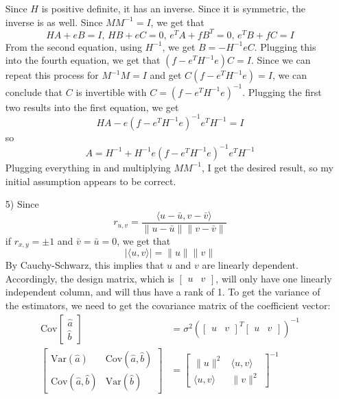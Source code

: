 \documentclass[11pt]{article}
\newcommand{\var}{\mathrm{Var}}
\newcommand{\cov}{\mathrm{Cov}}
\theoremstyle{definition}
\begin{document}
\begin{itemize}
        Since $H$ is positive definite, it has an inverse. Since it is symmetric, the inverse is as well. Since \(MM^{-1}=I\), we get that
        \[HA+eB=I, \, HB+eC=0, \, e^TA+fB^T=0, \, e^TB+fC=I\]
        From the second equation, using $H^{-1}$, we get \(B=-H^{-1}eC\). Plugging this into the fourth equation, we get that \((f-e^TH^{-1}e)C=I\). Since we can repeat this process for \(M^{-1}M=I\) and get \(C(f-e^TH^{-1}e)=I\), we can conclude that $C$ is invertible with \(C=(f-e^TH^{-1}e)^{-1}\). Plugging the first two results into the first equation, we get
        \[HA-e(f-e^TH^{-1}e)^{-1}e^TH^{-1}=I\]
        so
        \[A=H^{-1} + H^{-1}e(f-e^TH^{-1}e)^{-1}e^TH^{-1}\]
        Plugging everything in and multiplying $MM^{-1}$, I get the desired result, so my initial assumption appears to be correct.
    \item[5)]
        Since 
        \[r_{u,v}=\frac{\langle u - \bar u, v -\bar v\rangle}{\|u-\bar u\|\|v-\bar v\|} \]
        if \(r_{x,y}=\pm 1\) and \(\bar v = \bar u = 0\), we get that
        \[\vert\langle u, v\rangle\vert = \|u\|\|v\| \]
        By Cauchy-Schwarz, this implies that \(u\) and \(v\) are linearly dependent. Accordingly, the design matrix, which is \( [\begin{array}{cc}u & v\end{array}]\), will only have one linearly independent column, and will thus have a rank of 1.
        \smallskip
        To get the variance of the estimators, we need to get the covariance matrix of the coefficient vector:
        \begin{align*}
            \cov\left[\begin{array}{c}\hat a \\ \hat b \end{array}\right] &= \sigma^2\left([\begin{array}{cc}u & v\end{array}]^T[\begin{array}{cc}u & v\end{array}]\right)^{-1} \\
            \left[\begin{array}{cc} \var(\hat a) & \cov(\hat a,\hat b) \\ \cov(\hat a,\hat b) & \var(\hat b) \end{array} \right] &= \left[\begin{array}{cc} \|u\|^2 & \langle u, v \rangle \\ \langle u, v \rangle & \|v\|^2 \end{array} \right]^{-1} \\

\end{align*}
\end{itemize}
\end{document}
